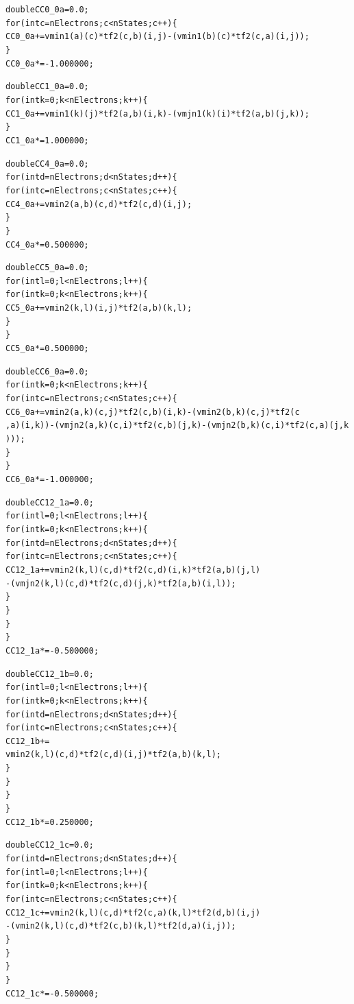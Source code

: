 \documentclass[letterpaper,10pt,english]{/Users/kinealicegulbrandsen/anaconda/lib/python2.7/site-packages/sphinx/texinputs/sphinxhowto}
\newenvironment{InvisibleVerbatim}
        {\begin{mdframed}[leftmargin=0.1\linewidth,innerleftmargin=3pt,innerrightmargin=3pt, userdefinedwidth=1\linewidth, linewidth=0pt, linecolor=white, usetwoside=false]}
        {\end{mdframed}}
\begin{document}
                \begin{InvisibleVerbatim}
                \vspace{-0.5\baselineskip}
\begin{alltt}
double CC0\_0a = 0.0;
for(int c = nElectrons; c < nStates; c ++)\{
    CC0\_0a += vmin1(a)(c)*tf2(c,b)(i,j)-(vmin1(b)(c)*tf2(c,a)(i,j));
\}
CC0\_0a *= -1.000000;


double CC1\_0a = 0.0;
for(int k = 0; k < nElectrons; k ++)\{
    CC1\_0a += vmin1(k)(j)*tf2(a,b)(i,k)-(vmjn1(k)(i)*tf2(a,b)(j,k));
\}
CC1\_0a *= 1.000000;


double CC4\_0a = 0.0;
for(int d = nElectrons; d < nStates; d ++)\{
    for(int c = nElectrons; c < nStates; c ++)\{
        CC4\_0a += vmin2(a,b)(c,d)*tf2(c,d)(i,j);
    \}
\}
CC4\_0a *= 0.500000;


double CC5\_0a = 0.0;
for(int l = 0; l < nElectrons; l ++)\{
    for(int k = 0; k < nElectrons; k ++)\{
        CC5\_0a += vmin2(k,l)(i,j)*tf2(a,b)(k,l);
    \}
\}
CC5\_0a *= 0.500000;


double CC6\_0a = 0.0;
for(int k = 0; k < nElectrons; k ++)\{
    for(int c = nElectrons; c < nStates; c ++)\{
        CC6\_0a += vmin2(a,k)(c,j)*tf2(c,b)(i,k)-(vmin2(b,k)(c,j)*tf2(c
,a)(i,k))-(vmjn2(a,k)(c,i)*tf2(c,b)(j,k)-(vmjn2(b,k)(c,i)*tf2(c,a)(j,k
)));
    \}
\}
CC6\_0a *= -1.000000;


double CC12\_1a = 0.0;
for(int l = 0; l < nElectrons; l ++)\{
    for(int k = 0; k < nElectrons; k ++)\{
        for(int d = nElectrons; d < nStates; d ++)\{
            for(int c = nElectrons; c < nStates; c ++)\{
                CC12\_1a += vmin2(k,l)(c,d)*tf2(c,d)(i,k)*tf2(a,b)(j,l)
-(vmjn2(k,l)(c,d)*tf2(c,d)(j,k)*tf2(a,b)(i,l));
            \}
        \}
    \}
\}
CC12\_1a *= -0.500000;


double CC12\_1b = 0.0;
for(int l = 0; l < nElectrons; l ++)\{
    for(int k = 0; k < nElectrons; k ++)\{
        for(int d = nElectrons; d < nStates; d ++)\{
            for(int c = nElectrons; c < nStates; c ++)\{
                CC12\_1b +=
vmin2(k,l)(c,d)*tf2(c,d)(i,j)*tf2(a,b)(k,l);
            \}
        \}
    \}
\}
CC12\_1b *= 0.250000;


double CC12\_1c = 0.0;
for(int d = nElectrons; d < nStates; d ++)\{
    for(int l = 0; l < nElectrons; l ++)\{
        for(int k = 0; k < nElectrons; k ++)\{
            for(int c = nElectrons; c < nStates; c ++)\{
                CC12\_1c += vmin2(k,l)(c,d)*tf2(c,a)(k,l)*tf2(d,b)(i,j)
-(vmin2(k,l)(c,d)*tf2(c,b)(k,l)*tf2(d,a)(i,j));
            \}
        \}
    \}
\}
CC12\_1c *= -0.500000;



\end{alltt}
\end{InvisibleVerbatim}
\end{document}
